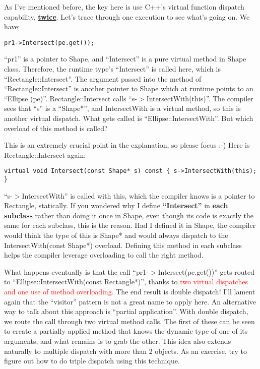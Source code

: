 \documentclass{book}
\begin{document}
As I've mentioned before, the key here is use C++'s virtual function dispatch capability, \underline{\textbf{twice}}. Let's trace through one execution to see what's going on. We have:
\begin{verbatim}
pr1->Intersect(pe.get());
\end{verbatim}
``pr1'' is a pointer to Shape, and ``Intersect'' is a pure virtual method in Shape class. Therefore, the runtime type's ``Intersect'' is called here, which is ``Rectangle::Intersect''.
The argument passed into the method of ``Rectangle::Intersect'' is another pointer to Shape which at runtime points to an ``Ellipse (pe)''.
Rectangle::Intersect calls ``s-$>$IntersectWith(this)''. The compiler sees that ``s'' is a ``Shape*'', and IntersectWith is a virtual method, so this is another virtual dispatch.
What gets called is ``Ellipse::IntersectWith''. But which overload of this method is called?

This is an extremely crucial point in the explanation, so please focus :-) Here is Rectangle::Intersect again:
\begin{verbatim}
virtual void Intersect(const Shape* s) const { s->IntersectWith(this); }
\end{verbatim}
``s-$>$IntersectWith'' is called with this, which the compiler knows is a pointer to Rectangle, statically.
If you wondered why I define \textbf{``Intersect''} in \textbf{each subclass} rather than doing it once in Shape, even though its code is exactly the same for each subclass, this is the reason.
Had I defined it in Shape, the compiler would think the type of this is Shape* and would always dispatch to the IntersectWith(const Shape*) overload.
Defining this method in each subclass helps the compiler leverage overloading to call the right method.

What happens eventually is that the call ``pr1-$>$Intersect(pe.get())'' gets routed to ``Ellipse::IntersectWith(const Rectangle*)'', thanks to \textcolor{red}{two virtual dispatches 
and one use of method overloading.}
The end result is double dispatch!  
I'll lament again that the ``visitor'' pattern is not a great name to apply here. 
An alternative way to talk about this approach is ``partial application''. 
With double dispatch, we route the call through two virtual method calls. 
The first of these can be seen to create a partially applied method that knows the dynamic type of one of its arguments, and what remains is to grab the other.
This idea also extends naturally to multiple dispatch with more than 2 objects. As an exercise, try to figure out how to do triple dispatch using this technique.
\end{document}
